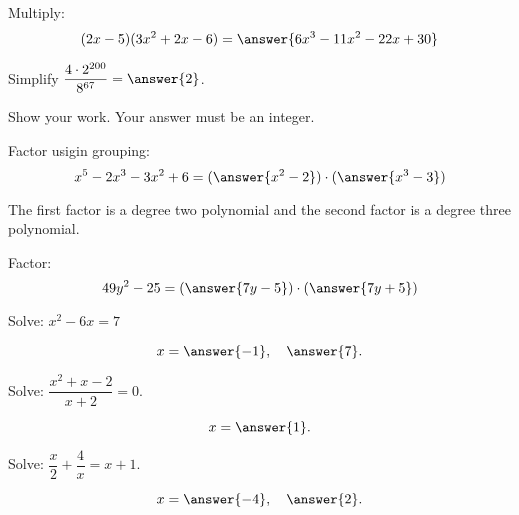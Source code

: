 \documentclass{ximera}
\begin{document}
\begin{problem}

Multiply: \hspace{1 cm} 
$$(2x -5)(3x^2 +2x -6)
=
\answer{6x^3-11x^2-22x+30}
$$



\end{problem}



\begin{problem}

Simplify $\dfrac{4\cdot 2^{200}}{8^{67}}=\answer{2}$.

Show your work. Your answer must be an integer. \\ 



\end{problem}



\begin{problem}

Factor usigin grouping:  
$$x^5 - 2 x^3 - 3x^2 +6
=
(\answer{x^2-2})\cdot(\answer{x^3-3})$$

The first factor is a degree two polynomial and the second factor is a degree three polynomial.


\end{problem}



\begin{problem}

Factor: 
$$49y^2 - 25
=
(\answer{7y-5})\cdot (\answer{7y+5})$$

\end{problem}



\begin{problem}

Solve: \hspace{1cm} $x^2 - 6x = 7$

$$x=\answer{-1},~~~ \answer{7}.$$


\end{problem}



\begin{problem}

Solve: \hspace{1cm} $\dfrac{x^2+x-2}{x+2}= 0$.


$$x=\answer{1}.$$
\end{problem}



\begin{problem}
Solve: \hspace{1cm} $\dfrac{x}{2}+\dfrac{4}{x}= x+1$.

$$x=\answer{-4}, ~~~ \answer{2}.$$

\end{problem}
\end{document}
